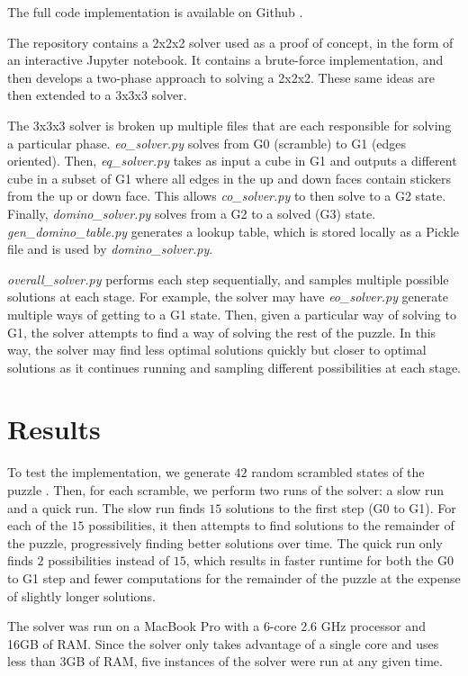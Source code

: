 \documentclass{article}
\begin{document}
The full code implementation is available on Github \cite{git-solver}.

The repository contains a 2x2x2 solver used as a proof of concept, in the form of an interactive Jupyter notebook. It contains a brute-force implementation, and then develops a two-phase approach to solving a 2x2x2. These same ideas are then extended to a 3x3x3 solver.

The 3x3x3 solver is broken up multiple files that are each responsible for solving a particular phase. \emph{eo\_solver.py} solves from G0 (scramble) to G1 (edges oriented). Then, \emph{eq\_solver.py} takes as input a cube in G1 and outputs a different cube in a subset of G1 where all edges in the up and down faces contain stickers from the up or down face. This allows \emph{co\_solver.py} to then solve to a G2 state. Finally, \emph{domino\_solver.py} solves from a G2 to a solved (G3) state. \emph{gen\_domino\_table.py} generates a lookup table, which is stored locally as a Pickle file and is used by \emph{domino\_solver.py}. 

\emph{overall\_solver.py} performs each step sequentially, and samples multiple possible solutions at each stage. For example, the solver may have \emph{eo\_solver.py} generate multiple ways of getting to a G1 state. Then, given a particular way of solving to G1, the solver attempts to find a way of solving the rest of the puzzle. In this way, the solver may find less optimal solutions quickly but closer to optimal solutions as it continues running and sampling different possibilities at each stage.

\section{Results}

To test the implementation, we generate $42$ random scrambled states of the puzzle \cite{cstimer}. Then, for each scramble, we perform two runs of the solver: a slow run and a quick run. The slow run finds $15$ solutions to the first step (G0 to G1). For each of the $15$ possibilities, it then attempts to find solutions to the remainder of the puzzle, progressively finding better solutions over time. The quick run only finds $2$ possibilities instead of $15$, which results in faster runtime for both the G0 to G1 step and fewer computations for the remainder of the puzzle at the expense of slightly longer solutions.

The solver was run on a MacBook Pro with a 6-core 2.6 GHz processor and 16GB of RAM. Since the solver only takes advantage of a single core and uses less than $3$GB of RAM, five instances of the solver were run at any given time.
\end{document}
